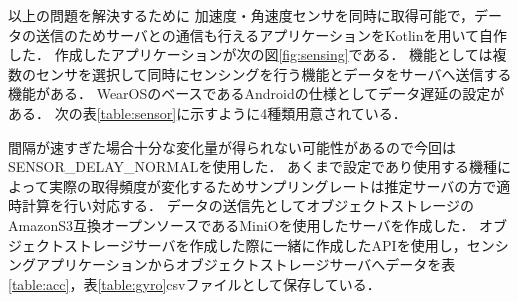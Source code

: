 以上の問題を解決するために
加速度・角速度センサを同時に取得可能で，データの送信のためサーバとの通信も行えるアプリケーションをKotlinを用いて自作した．
作成したアプリケーションが次の図\ref{fig:sensing}である．
機能としては複数のセンサを選択して同時にセンシングを行う機能とデータをサーバへ送信する機能がある．
WearOSのベースであるAndroidの仕様としてデータ遅延の設定がある．
次の表\ref{table:sensor}に示すように4種類用意されている．
\begin{table}[ht]
    \centering
    \caption{センサのデータ遅延設定}
    \label{table:sensor}
\end{table}
間隔が速すぎた場合十分な変化量が得られない可能性があるので今回はSENSOR\_DELAY\_NORMALを使用した．
あくまで設定であり使用する機種によって実際の取得頻度が変化するためサンプリングレートは推定サーバの方で適時計算を行い対応する．
データの送信先としてオブジェクトストレージのAmazonS3互換オープンソースであるMiniOを使用したサーバを作成した．
オブジェクトストレージサーバを作成した際に一緒に作成したAPIを使用し，センシングアプリケーションからオブジェクトストレージサーバへデータを表\ref{table:acc}，表\ref{table:gyro}csvファイルとして保存している．
\begin{table}[ht]
    \centering
    \caption{加速度データの形式の例}
    \label{table:acc}
\end{table}
